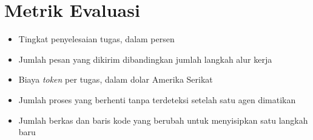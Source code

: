 \documentclass[11pt,a4paper]{article}
\begin{document}
\section{Metrik Evaluasi}

\begin{itemize}[leftmargin=*]
  \item Tingkat penyelesaian tugas, dalam persen
  \item Jumlah pesan yang dikirim dibandingkan jumlah langkah alur kerja
  \item Biaya \textit{token} per tugas, dalam dolar Amerika Serikat
  \item Jumlah proses yang berhenti tanpa terdeteksi setelah satu agen dimatikan
  \item Jumlah berkas dan baris kode yang berubah untuk menyisipkan satu langkah baru
\end{itemize}



\end{document}
